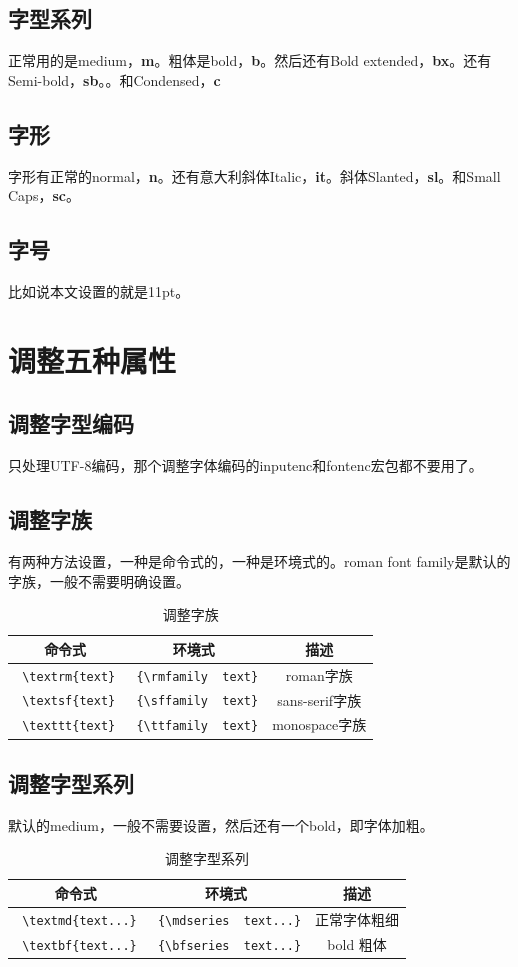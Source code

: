 \documentclass[11pt,oneside]{book}
\begin{document}
\subsection{字型系列}
正常用的是medium，\textbf{m}。粗体是bold，\textbf{b}。然后还有Bold extended，\textbf{bx}。还有Semi-bold，\textbf{sb}。。和Condensed，\textbf{c}


\subsection{字形}
字形有正常的normal，\textbf{n}。还有意大利斜体Italic，\textbf{it}。斜体Slanted，\textbf{sl}。和Small Caps，\textbf{sc}。


\subsection{字号}
比如说本文设置的就是11pt。



\section{调整五种属性}
\subsection{调整字型编码}
\XeLaTeX 只处理UTF-8编码，那个调整字体编码的inputenc和fontenc宏包都不要用了。


\subsection{调整字族}
有两种方法设置，一种是命令式的，一种是环境式的。roman font family是默认的字族，一般不需要明确设置。
\begin{table}[H]
\centering
\label{tab:调整字族}
\begin{tabular}{|c|c|c|}
\hline
命令式 & 环境式 & 描述 \\
\hline
\verb+ \textrm{text}+ & \verb+ {\rmfamily  text}+  & roman字族 \\
\verb+ \textsf{text}+ & \verb+ {\sffamily  text}+  & sans-serif字族 \\
\verb+ \texttt{text}+ & \verb+ {\ttfamily  text}+  & monospace字族 \\
\hline
\end{tabular}
\caption{调整字族}
\end{table}

\subsection{调整字型系列}
默认的medium，一般不需要设置，然后还有一个bold，即字体加粗。
\begin{table}[H]
\centering
\label{tab:调整字型系列}
\begin{tabular}{|c|c|c|}
\hline
命令式 & 环境式 & 描述 \\
\hline
\verb+ \textmd{text...}+ & \verb+ {\mdseries  text...}+  & 正常字体粗细 \\  
\verb+ \textbf{text...}+ & \verb+ {\bfseries  text...}+  & bold 粗体 \\
\hline
\end{tabular}
\caption{调整字型系列}
\end{table}
\end{document}
